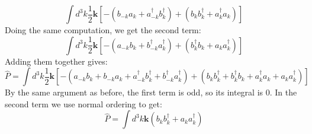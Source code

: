 \documentclass[12 pt]{article}
\begin{document}
\[      \int d^3 k \frac{1}{2}    \mathbf{k}  \left[ -  (b_{-k}a_k + a_{-k}^{\dagger}b_k^{\dagger}) + (b_{k} b_k^{\dagger} + a_{k}^{\dagger} a_k)  \right]       \]
Doing the same computation, we get the second term:
\[       \int d^3 k \frac{1}{2}    \mathbf{k}  \left[ -  (a_{-k}b_k + b_{-k}^{\dagger}a_k^{\dagger}) + (b_{k}^{\dagger} b_k + a_{k} a_k^{\dagger})  \right]             
 \]
Adding them together gives:
\[      \hat P = \int d^3 k \frac{1}{2} \mathbf{k} \left[   -  ( a_{-k} b_{k} + b_{-k} a_{k} +  a^{\dagger}_{-k} b^{\dagger}_{k} + b^{\dagger}_{-k} a^{\dagger}_{k}  ) + ( b_{k} b_k^{\dagger} +  b^{\dagger}_{k} b_k + a_{k}^{\dagger} a_k + a_{k} a^{\dagger}_k )  \right]      \]
By the same argument as before, the first term is odd, so its integral is 0. In the second term we use normal ordering to get:
\[         \hat P = \int d^3 k \mathbf{k} (  b_{k} b_k^{\dagger} + a_{k} a^{\dagger}_k  )       \]
\end{document}
